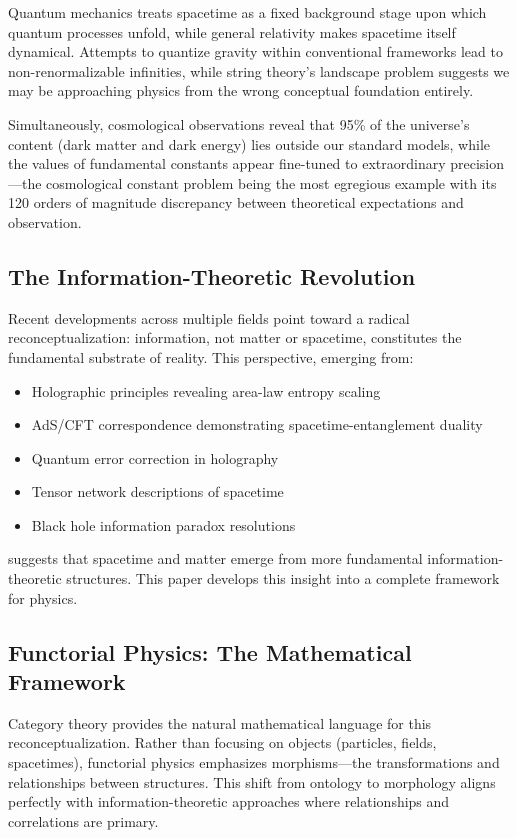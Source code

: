\documentclass[11pt,a4paper]{article}
\theoremstyle{definition}
\begin{document}
Quantum mechanics treats spacetime as a fixed background stage upon which quantum processes unfold, while general relativity makes spacetime itself dynamical. Attempts to quantize gravity within conventional frameworks lead to non-renormalizable infinities, while string theory's landscape problem suggests we may be approaching physics from the wrong conceptual foundation entirely.

Simultaneously, cosmological observations reveal that 95\% of the universe's content (dark matter and dark energy) lies outside our standard models, while the values of fundamental constants appear fine-tuned to extraordinary precision—the cosmological constant problem being the most egregious example with its 120 orders of magnitude discrepancy between theoretical expectations and observation.

\subsection{The Information-Theoretic Revolution}

Recent developments across multiple fields point toward a radical reconceptualization: information, not matter or spacetime, constitutes the fundamental substrate of reality. This perspective, emerging from:

\begin{itemize}
\item Holographic principles revealing area-law entropy scaling \cite{tHooft1993,Susskind1995}
\item AdS/CFT correspondence demonstrating spacetime-entanglement duality \cite{Maldacena1998}
\item Quantum error correction in holography \cite{Almheiri2015}
\item Tensor network descriptions of spacetime \cite{Swingle2012}
\item Black hole information paradox resolutions \cite{Page1993,Hayden2007}
\end{itemize}

suggests that spacetime and matter emerge from more fundamental information-theoretic structures. This paper develops this insight into a complete framework for physics.

\subsection{Functorial Physics: The Mathematical Framework}

Category theory provides the natural mathematical language for this reconceptualization. Rather than focusing on objects (particles, fields, spacetimes), functorial physics emphasizes morphisms—the transformations and relationships between structures. This shift from ontology to morphology aligns perfectly with information-theoretic approaches where relationships and correlations are primary.
\end{document}
